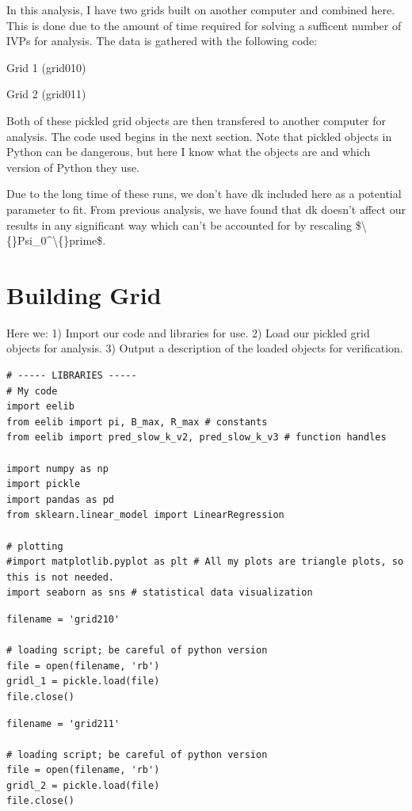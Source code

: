 \documentclass{article}
\begin{document}
In this analysis, I have two grids built on another computer and combined here. This is done due to the amount of time required for solving a sufficent number of IVPs for analysis.
The data is gathered with the following code:

Grid 1 (grid010)

Grid 2 (grid011)

Both of these pickled grid objects are then transfered to another computer for analysis. The code used begins in the next section. Note that pickled objects in Python can be dangerous, but here I know what the objects are and which version of Python they use.

Due to the long time of these runs, we don't have dk included here as a potential parameter to fit. From previous analysis, we have found that dk doesn't affect our results in any significant way which can't be accounted for by rescaling \$\textbackslash\{\}Psi\_0\textasciicircum{}\textbackslash\{\}prime\$. 

\section{Building Grid}

Here we:
1) Import our code and libraries for use. 
2) Load our pickled grid objects for analysis.
3) Output a description of the loaded objects for verification.

\begin{lstlisting}
# ----- LIBRARIES -----
# My code
import eelib
from eelib import pi, B_max, R_max # constants
from eelib import pred_slow_k_v2, pred_slow_k_v3 # function handles

import numpy as np
import pickle
import pandas as pd
from sklearn.linear_model import LinearRegression

# plotting
#import matplotlib.pyplot as plt # All my plots are triangle plots, so this is not needed.
import seaborn as sns # statistical data visualization\end{lstlisting}

\begin{lstlisting}
filename = 'grid210'

# loading script; be careful of python version
file = open(filename, 'rb')    
gridl_1 = pickle.load(file)
file.close()\end{lstlisting}

\begin{lstlisting}
filename = 'grid211'

# loading script; be careful of python version
file = open(filename, 'rb')    
gridl_2 = pickle.load(file)
file.close()\end{lstlisting}
\end{document}
